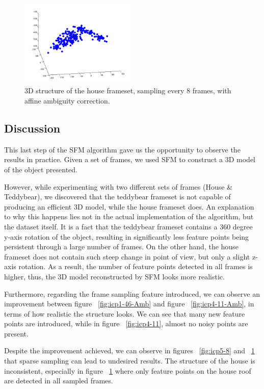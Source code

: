 \begin{figure}[ht!]
  \centering
    \includegraphics[width=0.49\textwidth]{figures/icp8-5.png}
    \caption{3D structure of the house frameset, sampling every 8 frames, with affine ambiguity correction.}
    \label{fig:icp8-5}
\end{figure}



\subsection{Discussion}
This last step of the SFM algorithm gave us the opportunity to observe the results in practice. Given a set of frames, we used SFM to construct a 3D model of the object presented. 

However, while experimenting with two different sets of frames (House \& Teddybear), we discovered that the teddybear frameset is not capable of producing an efficient 3D model, while the house frameset does. An explanation to why this happens lies not in the actual implementation of the algorithm, but the dataset itself. It is a fact that the teddybear frameset contains a 360 degree y-axis rotation of the object, resulting in significantly less feature points being persistent through a large number of frames. 
On the other hand, the house frameset does not contain such steep change in point of view, but only a slight z-axis rotation. As a result, the number of feature points detected in all frames is higher, thus, the 3D model reconstructed by SFM looks more realistic.

Furthermore, regarding the frame sampling feature introduced, we can observe an improvement between figure ~\ref{fig:icp1-46-Amb} and figure ~\ref{fig:icp4-11-Amb}, in terms of how realistic the structure looks. We can see that many new feature points are introduced, while in figure ~\ref{fig:icp4-11}, almost no noisy points are present.

Despite the improvement achieved, we can observe in figures ~\ref{fig:icp5-8} and ~\ref{fig:icp8-5} that sparse sampling can lead to undesired results. The structure of the house is inconsistent, especially in figure ~\ref{fig:icp8-5} where only feature points on the house roof are detected in all sampled frames. 

